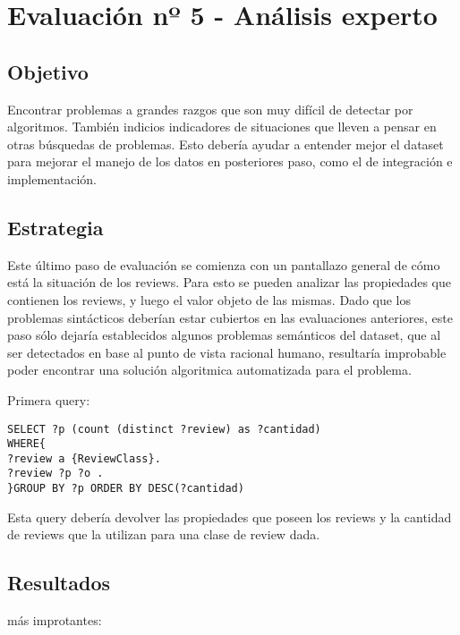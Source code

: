 \section{Evaluación nº 5 - Análisis experto}
\label{section:evaluacion-analisis}

\subsection*{Objetivo} Encontrar problemas a grandes razgos que son muy difícil de detectar por algoritmos. También indicios indicadores de 
situaciones que lleven a pensar en otras búsquedas de problemas. Esto debería ayudar a entender mejor el dataset para mejorar el manejo 
de los datos en posteriores paso, como el de integración e implementación.

\subsection*{Estrategia} Este último paso de evaluación se comienza con un pantallazo general de cómo está la situación de los reviews. Para esto se pueden analizar las propiedades que contienen los reviews, y luego el valor objeto 
de las mismas. Dado que los problemas sintácticos deberían estar cubiertos en las evaluaciones anteriores, este paso sólo dejaría establecidos
algunos problemas semánticos del dataset, que al ser detectados en base al punto de vista racional humano, resultaría improbable poder encontrar
una solución algoritmica automatizada para el problema.

Primera query:

\begin{lstlisting}[frame=single]
SELECT ?p (count (distinct ?review) as ?cantidad) 
WHERE{
?review a {ReviewClass}.
?review ?p ?o .
}GROUP BY ?p ORDER BY DESC(?cantidad)
\end{lstlisting}

Esta query debería devolver las propiedades que poseen los reviews y la cantidad de reviews que la utilizan para una clase de review dada.

\subsection*{Resultados} más improtantes:


